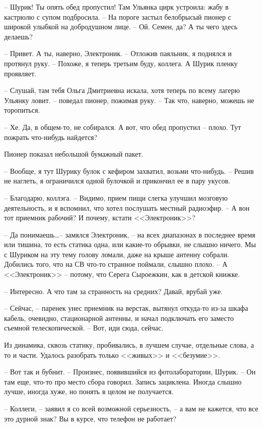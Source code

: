 \documentclass[a4paper]{book}
\begin{document}
-- Шурик! Ты опять обед пропустил! Там Ульянка цирк устроила: жабу в кастрюлю с супом подбросила. -- На пороге застыл белобрысый пионер с широкой улыбкой на добродушном лице. -- Ой. Семен, да? А ты чего здесь делаешь?

-- Привет. А ты, наверно, Электроник. -- Отложив паяльник, я поднялся и протянул руку. -- Похоже, я теперь третьим буду, коллега. А Шурик пленку проявляет.

-- Слушай, там тебя Ольга Дмитриевна искала, хотя теперь по всему лагерю Ульянку ловит. -- поведал пионер, пожимая руку. -- Так что, наверно, можешь не торопиться. 

-- Хе. Да, в общем-то, не собирался. А вот, что обед пропустил -- плохо. Тут пожрать что-нибудь найдется?

Пионер показал небольшой бумажный пакет. 

-- Вообще, я тут Шурику булок с кефиром захватил, возьми что-нибудь. -- Решив не наглеть, я ограничился одной булочкой и прикончил ее в пару укусов. 

-- Благодарю, коллэга. -- Видимо, прием пищи слегка улучшил мозговую деятельность, и я вспомнил, что хотел послушать местный радиоэфир. -- А вон тот приемник рабочий? И почему, кстати <<Электроник>>?

-- Да понимаешь\ldots -- замялся Электроник, -- на всех диапазонах в последнее время или тишина, то есть статика одна, или какие-то обрывки, не слышно ничего. Мы с Шуриком на эту тему голову ломали, даже на крыше антенну собрали. Добились того, что на СВ что-то странное поймали, слышно плохо. -- А <<Электроник>> -- потому, что Серега Сыроежкин, как в детской книжке.

-- Интересно. А что там за странность на средних? Давай, врубай уже.

-- Сейчас, -- паренек унес приемник на верстак, вытянул откуда-то из-за шкафа кабель, очевидно, стационарной антенны, и начал подключать его заместо съемной телескопической. -- Вот, иди сюда, сейчас.

Из динамика, сквозь статику, пробивались, в лучшем случае, отдельные слова, а то и части. Удалось разобрать только <<живых>> и <<безумие>>. 

-- Вот так и бубнит. -- Произнес, появившийся из фотолаборатории, Шурик. -- Он там еще, что-то про место сбора говорил. Запись зациклена. Иногда слышно лучше, иногда хуже, но понять в целом не получается. 

-- Коллеги, -- заявил я со всей возможной серьезность, -- а вам не кажется, что все это дурной знак? Вы в курсе, что телефон не работает?
\end{document}
